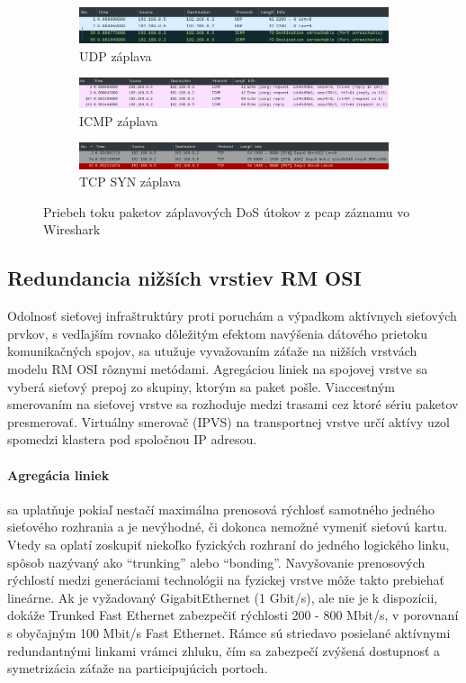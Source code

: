 \documentclass[12pt, a4paper]{article}
\begin{document}
\begin{figure}[h]
	\centering
	\begin{subfigure}[t]{\textwidth}
  		\centering
  		\includegraphics[width=\textwidth]{images/udp-flood.png}
  		\caption{UDP záplava}
	\end{subfigure}
	\begin{subfigure}[t]{\textwidth}
  		\centering
  		\includegraphics[width=\textwidth]{images/icmp-ping.png}
  		\caption{ICMP záplava}
	\end{subfigure}
	\begin{subfigure}[t]{\textwidth}
  		\centering
  		\includegraphics[width=\textwidth]{images/tcp-syn.png}
  		\caption{TCP SYN záplava}
	\end{subfigure}
	\caption{Priebeh toku paketov záplavových DoS útokov z pcap záznamu vo Wireshark}
\end{figure}

\subsection{Redundancia nižších vrstiev RM OSI}
Odolnosť sieťovej infraštruktúry proti poruchám a výpadkom aktívnych sieťových prvkov, s vedľajším
rovnako dôležitým efektom navýšenia dátového prietoku komunikačných spojov, sa utužuje vyvažovaním záťaže
na nižších vrstvách modelu RM OSI rôznymi metódami. Agregáciou liniek na spojovej vrstve sa vyberá sieťový 
prepoj zo skupiny, ktorým sa paket pošle. Viaccestným smerovaním na sieťovej vrstve sa rozhoduje medzi 
trasami cez ktoré sériu paketov presmerovať. Virtuálny smerovač (IPVS) na transportnej vrstve určí
aktívy uzol spomedzi klastera pod spoločnou IP adresou.

\paragraph{Agregácia liniek} sa uplatňuje pokiaľ nestačí maximálna prenosová rýchlosť
samotného jedného sieťového rozhrania a je nevýhodné, či dokonca nemožné vymeniť sieťovú kartu.
Vtedy sa oplatí zoskupiť niekoľko fyzických rozhraní do jedného logického linku, spôsob nazývaný
ako \enquote{trunking} alebo \enquote{bonding}. Navyšovanie prenosových rýchlostí
medzi generáciami technológii na fyzickej vrstve môže takto prebiehať lineárne. Ak je vyžadovaný
GigabitEthernet (1 Gbit/s), ale nie je k dispozícii, dokáže Trunked Fast Ethernet
zabezpečiť rýchlosti 200 - 800 Mbit/s, v porovnaní s obyčajným 100 Mbit/s Fast Ethernet. 
Rámce sú striedavo posielané aktívnymi redundantnými linkami vrámci zhluku, čím
sa zabezpečí zvýšená dostupnosť a symetrizácia záťaže na participujúcich portoch.
\end{document}
